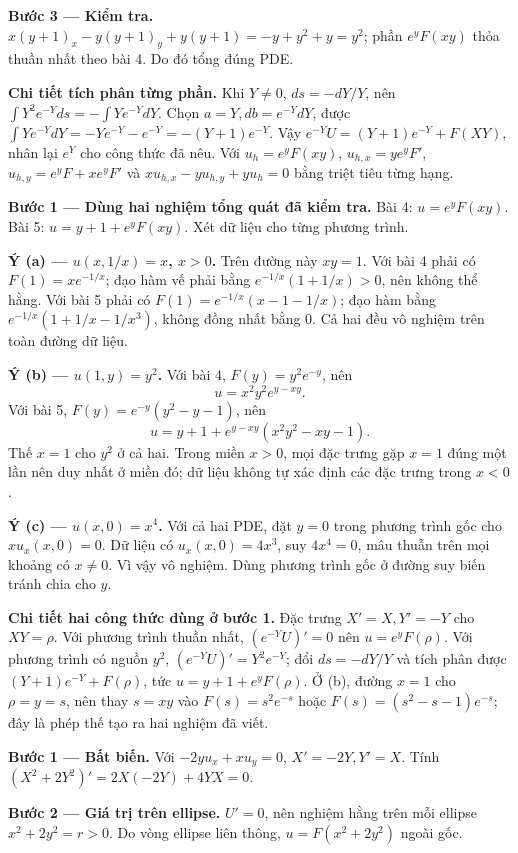 \textbf{Bước 3 — Kiểm tra.} $x(y+1)_x-y(y+1)_y+y(y+1)=-y+y^2+y=y^2$; phần $e^yF(xy)$ thỏa thuần nhất theo bài 4. Do đó tổng đúng PDE.

\textbf{Chi tiết tích phân từng phần.} Khi $Y\ne0$, $ds=-dY/Y$, nên $\int Y^2e^{-Y}ds=-\int Ye^{-Y}dY$. Chọn $a=Y,db=e^{-Y}dY$, được $\int Ye^{-Y}dY=-Ye^{-Y}-e^{-Y}=-(Y+1)e^{-Y}$. Vậy $e^{-Y}U=(Y+1)e^{-Y}+F(XY)$, nhân lại $e^Y$ cho công thức đã nêu. Với $u_h=e^yF(xy)$, $u_{h,x}=ye^yF'$, $u_{h,y}=e^yF+xe^yF'$ và $xu_{h,x}-yu_{h,y}+yu_h=0$ bằng triệt tiêu từng hạng.

\textbf{Bước 1 — Dùng hai nghiệm tổng quát đã kiểm tra.} Bài 4: $u=e^yF(xy)$. Bài 5: $u=y+1+e^yF(xy)$. Xét dữ liệu cho từng phương trình.

\textbf{Ý (a) — $u(x,1/x)=x$, $x>0$.} Trên đường này $xy=1$. Với bài 4 phải có $F(1)=xe^{-1/x}$; đạo hàm vế phải bằng $e^{-1/x}(1+1/x)>0$, nên không thể hằng. Với bài 5 phải có $F(1)=e^{-1/x}(x-1-1/x)$; đạo hàm bằng $e^{-1/x}(1+1/x-1/x^3)$, không đồng nhất bằng 0. Cả hai đều vô nghiệm trên toàn đường dữ liệu.

\textbf{Ý (b) — $u(1,y)=y^2$.} Với bài 4, $F(y)=y^2e^{-y}$, nên
\[u=x^2y^2e^{y-xy}.\]
Với bài 5, $F(y)=e^{-y}(y^2-y-1)$, nên
\[u=y+1+e^{y-xy}(x^2y^2-xy-1).\]
Thế $x=1$ cho $y^2$ ở cả hai. Trong miền $x>0$, mọi đặc trưng gặp $x=1$ đúng một lần nên duy nhất ở miền đó; dữ liệu không tự xác định các đặc trưng trong $x<0$.

\textbf{Ý (c) — $u(x,0)=x^4$.} Với cả hai PDE, đặt $y=0$ trong phương trình gốc cho $xu_x(x,0)=0$. Dữ liệu có $u_x(x,0)=4x^3$, suy $4x^4=0$, mâu thuẫn trên mọi khoảng có $x\ne0$. Vì vậy vô nghiệm. Dùng phương trình gốc ở đường suy biến tránh chia cho $y$.

\textbf{Chi tiết hai công thức dùng ở bước 1.} Đặc trưng $X'=X,Y'=-Y$ cho $XY=\rho$. Với phương trình thuần nhất, $(e^{-Y}U)'=0$ nên $u=e^yF(\rho)$. Với phương trình có nguồn $y^2$, $(e^{-Y}U)'=Y^2e^{-Y}$; đổi $ds=-dY/Y$ và tích phân được $(Y+1)e^{-Y}+F(\rho)$, tức $u=y+1+e^yF(\rho)$. Ở (b), đường $x=1$ cho $\rho=y=s$, nên thay $s=xy$ vào $F(s)=s^2e^{-s}$ hoặc $F(s)=(s^2-s-1)e^{-s}$; đây là phép thế tạo ra hai nghiệm đã viết.

\textbf{Bước 1 — Bất biến.} Với $-2yu_x+xu_y=0$, $X'=-2Y,Y'=X$. Tính $(X^2+2Y^2)'=2X(-2Y)+4YX=0$.

\textbf{Bước 2 — Giá trị trên ellipse.} $U'=0$, nên nghiệm hằng trên mỗi ellipse $x^2+2y^2=r>0$. Do vòng ellipse liên thông, $u=F(x^2+2y^2)$ ngoài gốc.

